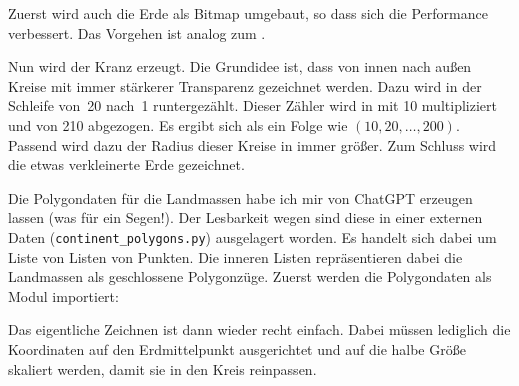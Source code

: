 Zuerst wird auch die Erde als Bitmap umgebaut, so dass sich die Performance verbessert. Das Vorgehen ist analog zum .


\begin{figure}%
	\begin{center}%
		\vspace{-1cm}%
	\end{center}%
\end{figure}%
Nun wird der Kranz erzeugt. Die Grundidee ist, dass von innen nach außen Kreise mit immer stärkerer Transparenz gezeichnet werden. Dazu wird in der Schleife von~20 nach~1 runtergezählt. Dieser Zähler wird in  mit 10 multipliziert und von 210 abgezogen. Es ergibt sich als ein Folge wie $(10, 20, \ldots, 200)$. Passend wird dazu der Radius dieser Kreise in  immer größer. Zum Schluss wird die etwas verkleinerte Erde gezeichnet.


\begin{figure}%
	\begin{center}%
		\vspace{-1cm}%
	\end{center}%
\end{figure}%
Die Polygondaten für die Landmassen habe ich mir von ChatGPT erzeugen lassen (was für ein Segen!). Der Lesbarkeit wegen sind diese in einer externen Daten (\texttt{continent\_poly\-gons.py}) ausgelagert worden. Es handelt sich dabei um Liste von Listen von Punkten. Die inneren Listen repräsentieren dabei die Landmassen als geschlossene Polygonzüge. Zuerst werden die Polygondaten als Modul importiert:


Das eigentliche Zeichnen ist dann wieder recht einfach. Dabei müssen lediglich die Koordinaten auf den Erdmittelpunkt ausgerichtet und auf die halbe Größe skaliert werden, damit sie in den Kreis reinpassen.

